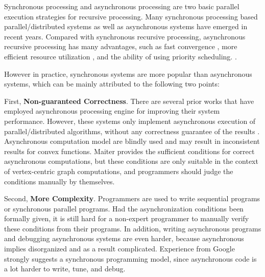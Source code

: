 Synchronous processing and asynchronous processing are two basic parallel execution strategies for recursive processing. Many synchronous processing based parallel/distributed systems \cite{Malewicz2010Pregel,Dean:2004:MSD:1251254.1251264,giraph,maiter,Fan:2017:PSG:3035918.3035942,Malewicz2010Pregel,8017445,Low:2012:DGF:2212351.2212354} as well as asynchronous systems \cite{Low:2012:DGF:2212351.2212354, Tian:2013:TLV:2732232.2732238, Han:2015:GUB:2777598.2777604, grace} have emerged in recent years. Compared with synchronous recursive processing, asynchronous recursive processing has many advantages, such as fast convergence \cite{maiter}, more efficient resource utilization \cite{priori-cidr}, and the ability of using priority scheduling. \cite{Zhang:2011:PDF:2038916.2038929}. %

However in practice, synchronous systems are more popular than asynchronous systems, which can be mainly attributed to the following two points:

First, \textbf{Non-guaranteed Correctness}. There are several prior works that have employed asynchronous processing engine for improving their system performance. However, these systems only implement asynchronous execution of parallel/distributed algorithms, without any correctness guarantee of the results \cite{Low:2012:DGF:2212351.2212354}. Asynchronous computation model are blindly used and may result in inconsistent results for convex functions. Maiter \cite{maiter} provides the sufficient conditions for correct asynchronous computations, but these conditions are only suitable in the context of vertex-centric graph computations, and programmers should judge the conditions manually by themselves.

Second, \textbf{More Complexity}. Programmers are used to write sequential programs or synchronous parallel programs. Had the asynchronization conditions been formally given, it is still hard for a non-expert programmer to manually verify these conditions from their programs. In addition, writing asynchronous programs and debugging asynchronous systems are even harder, because asynchronous implies disorganized and as a result complicated. Experience from Google \cite{Malewicz2010Pregel} strongly suggests a synchronous programming model, since asynchronous code is a lot harder to write, tune, and debug.

